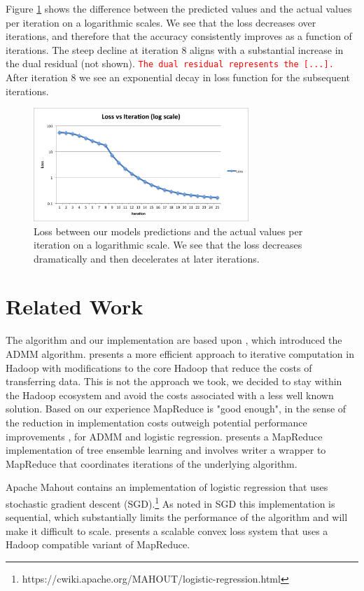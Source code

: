 \documentclass[10pt, conference, compsocconf]{IEEEtran}
\newcommand{\todo}[1]{\texttt{\textcolor{red}{#1}}}
\begin{document}
Figure \ref{fig:iter} shows the difference between the predicted values and the actual values per iteration on a logarithmic scales.  We see that the loss decreases over iterations, and therefore that the accuracy consistently improves as a function of iterations.  The steep decline at iteration 8 aligns with a substantial increase in the dual residual (not shown).  \todo{The dual residual represents the [...].} After iteration 8 we see an exponential decay in loss function for the subsequent iterations.

\begin{figure}[!t]
\centering
\includegraphics[width=3.2in]{iter_rnorm_plot}
\caption{Loss between our models predictions and the actual values per iteration on a logarithmic scale.  We see that the loss decreases dramatically and then decelerates at later iterations.}
\label{fig:iter}
\end{figure}

\section{Related Work}\label{sec:related}
The algorithm and our implementation are based upon \cite{boyd}, which introduced the ADMM algorithm.  \cite{bu2010} presents a more efficient approach to iterative computation in Hadoop with modifications to the core Hadoop that reduce the costs of transferring data.  This is not the approach we took, we decided to stay within the Hadoop ecosystem and avoid the costs associated with a less well known solution.  Based on our experience MapReduce is "good enough", in the sense of the reduction in implementation costs outweigh potential performance improvements \cite{lin2012}, for ADMM and logistic regression. \cite{planet} presents a MapReduce implementation of tree ensemble learning and involves writer a wrapper to MapReduce that coordinates iterations of the underlying algorithm.

Apache Mahout contains an implementation of logistic regression that uses stochastic gradient descent (SGD).\footnote{https://cwiki.apache.org/MAHOUT/logistic-regression.html}  As noted in \cite{agarwal2011} SGD this implementation is sequential, which substantially limits the performance of the algorithm and will make it difficult to scale.  \cite{agarwal2011} presents a scalable convex loss system that uses a Hadoop compatible variant of MapReduce.
\end{document}
